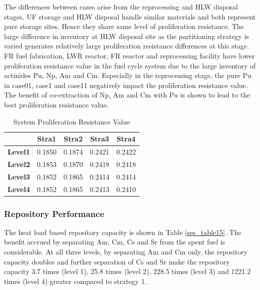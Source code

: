 The differences between cases arise from the reprocessing and HLW
disposal stages.  UF storage and HLW disposal handle similar materials
and both represent pure storage sites.  Hence they share same level of
proliferation resistance. The large difference in inventory at HLW
disposal site as the partitioning strategy is varied generates
relatively large proliferation resistance differences at this stage.  FR
fuel fabrication, LWR reactor, FR reactor and reprocessing facility have
lower proliferation resistance value in the fuel cycle system due to the
large inventory of actinides Pu, Np, Am and Cm. Especially in the
reprocessing stage, the pure Pu in case01, case1 and case11 negatively
impact the proliferation resistance value.  The benefit of co-extraction
of Np, Am and Cm with Pu is shown to lead to the best proliferation
resistance value.

\begin{table}[htbp]
\begin{center}
\caption{System Proliferation Resistance Value}
\label{ses_table14}
\begin{tabular}{|l|c|c|c|c|}
\hline
                & \textbf{Stra1} & \textbf{Stra2} & \textbf{Stra3} & \textbf{Stra4} \\
\hline
\textbf{Level1} & 0.1850         & 0.1874         & 0.2421         & 0.2422 \\
\textbf{Level2} & 0.1853         & 0.1870         & 0.2418         & 0.2418 \\
\textbf{Level3} & 0.1852         & 0.1865         & 0.2414         & 0.2414 \\
\textbf{Level4} & 0.1852         & 0.1865         & 0.2413         & 0.2410 \\
\hline
\end{tabular}
\end{center}
\end{table}



\subsubsection{Repository Performance}
\label{ses_sec:rep_perform}
The heat load based repository capacity is shown in Table \ref{ses_table15}.  The
benefit accrued by separating Am, Cm, Cs and Sr from the spent fuel is
considerable. At all three levels, by separating Am and Cm only, the
repository capacity doubles and further separation of Cs and Sr make the
repository capacity 3.7 times (level 1), 25.8 times (level 2), 228.5
times (level 3) and 1221.2 times (level 4) greater compared to strategy
1. 

